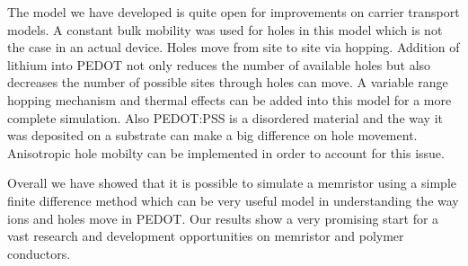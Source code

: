 \begin{doublespace}
The model we have developed is quite open for improvements on carrier transport models. A constant bulk mobility was used for holes in this model which is not the case in an actual device. Holes move from site to site via hopping. Addition of lithium into PEDOT not only reduces the number of available holes but also decreases the number of possible sites through holes can move. A variable range hopping mechanism and thermal effects can be added into this model for a more complete simulation. Also PEDOT:PSS is a disordered material and the way it was deposited on a substrate can make a big difference on hole movement. Anisotropic hole mobilty can be implemented in order to account for this issue.

Overall we have showed that it is possible to simulate a memristor using a simple finite difference method which can be very useful model in understanding the way ions and holes move in PEDOT. Our results show a very promising start for a vast research and development opportunities on memristor and polymer conductors.

\end{doublespace}

